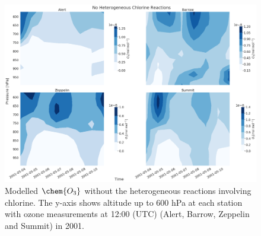 \begin{figure}
    \centering
    \includegraphics[width = \linewidth]{Chapter6_Results/images/noCl_2001_o3.png}
    \caption{Modelled $\chem{O_3}$ without the heterogeneous reactions involving chlorine. The y-axis shows altitude up to 600 hPa at each station with ozone measurements at 12:00 (UTC) (Alert, Barrow, Zeppelin and Summit) in 2001.}
    \label{fig:vert_noCl_o3_2001}
\end{figure}